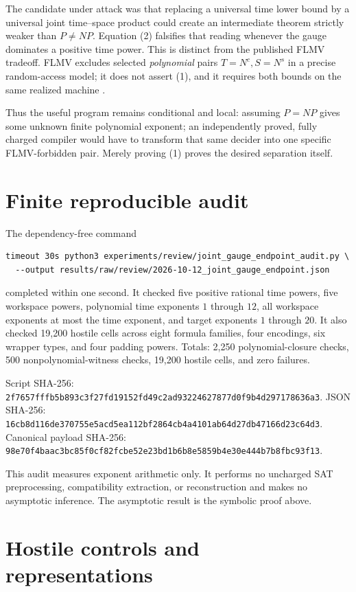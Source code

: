 \documentclass[11pt]{article}
\begin{document}
The candidate under attack was that replacing a universal time lower bound by
a universal joint time--space product could create an intermediate theorem
strictly weaker than $P\ne NP$.  Equation (2) falsifies that reading whenever
the gauge dominates a positive time power.  This is distinct from the
published FLMV tradeoff.  FLMV excludes selected \emph{polynomial} pairs
$T=N^c,S=N^s$ in a precise random-access model; it does not assert (1), and it
requires both bounds on the same realized machine \cite{FLMV05}.

Thus the useful program remains conditional and local: assuming $P=NP$ gives
some unknown finite polynomial exponent; an independently proved, fully
charged compiler would have to transform that same decider into one specific
FLMV-forbidden pair.  Merely proving (1) proves the desired separation itself.

\section{Finite reproducible audit}

The dependency-free command
\begin{verbatim}
timeout 30s python3 experiments/review/joint_gauge_endpoint_audit.py \
  --output results/raw/review/2026-10-12_joint_gauge_endpoint.json
\end{verbatim}
completed within one second.  It checked five positive rational time powers,
five workspace powers, polynomial time exponents $1$ through $12$, all
workspace exponents at most the time exponent, and target exponents $1$
through $20$.  It also checked 19,200 hostile cells across eight formula
families, four encodings, six wrapper types, and four padding powers.  Totals:
2,250 polynomial-closure checks, 500 nonpolynomial-witness checks, 19,200
hostile cells, and zero failures.

Script SHA-256:
\nolinkurl{2f7657fffb5b893c3f27fd19152fd49c2ad93224627877d0f9b4d297178636a3}.
JSON SHA-256:
\nolinkurl{16cb8d116de370755e5acd5ea112bf2864cb4a4101ab64d27db47166d23c64d3}.
Canonical payload SHA-256:
\nolinkurl{98e70f4baac3bc85f0cf82fcbe52e23bd1b6b8e5859b4e30e444b7b8fbc93f13}.

This audit measures exponent arithmetic only.  It performs no uncharged SAT
preprocessing, compatibility extraction, or reconstruction and makes no
asymptotic inference.  The asymptotic result is the symbolic proof above.

\section{Hostile controls and representations}
\end{document}
